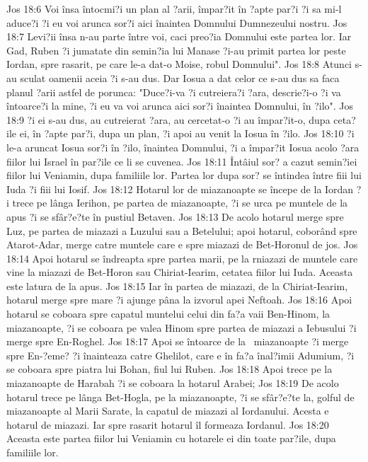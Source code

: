 Jos 18:6  Voi însa întocmi?i un plan al ?arii, împar?it în ?apte par?i ?i sa mi-l aduce?i ?i eu voi arunca sor?i aici înaintea Domnului Dumnezeului nostru.
Jos 18:7  Levi?ii însa n-au parte între voi, caci preo?ia Domnului este partea lor. Iar Gad, Ruben ?i jumatate din semin?ia lui Manase ?i-au primit partea lor peste Iordan, spre rasarit, pe care le-a dat-o Moise, robul Domnului".
Jos 18:8  Atunci s-au sculat oamenii aceia ?i s-au dus. Dar Iosua a dat celor ce s-au dus sa faca planul ?arii astfel de porunca: "Duce?i-va ?i cutreiera?i ?ara, descrie?i-o ?i va întoarce?i la mine, ?i eu va voi arunca aici sor?i înaintea Domnului, în ?ilo".
Jos 18:9  ?i ei s-au dus, au cutreierat ?ara, au cercetat-o ?i au împar?it-o, dupa ceta?ile ei, în ?apte par?i, dupa un plan, ?i apoi au venit la Iosua în ?ilo.
Jos 18:10  ?i le-a aruncat Iosua sor?i în ?ilo, înaintea Domnului, ?i a împar?it Iosua acolo ?ara fiilor lui Israel în par?ile ce li se cuvenea.
Jos 18:11  Întâiul sor? a cazut semin?iei fiilor lui Veniamin, dupa familiile lor. Partea lor dupa sor? se întindea între fiii lui Iuda ?i fiii lui Iosif.
Jos 18:12  Hotarul lor de miazanoapte se începe de la Iordan ?i trece pe lânga Ierihon, pe partea de miazanoapte, ?i se urca pe muntele de la apus ?i se sfâr?e?te în pustiul Betaven.
Jos 18:13  De acolo hotarul merge spre Luz, pe partea de miazazi a Luzului sau a Betelului; apoi hotarul, coborând spre Atarot-Adar, merge catre muntele care e spre miazazi de Bet-Horonul de jos.
Jos 18:14  Apoi hotarul se îndreapta spre partea marii, pe la rniazazi de muntele care vine la miazazi de Bet-Horon sau Chiriat-Iearim, cetatea fiilor lui Iuda. Aceasta este latura de la apus.
Jos 18:15  Iar în partea de miazazi, de la Chiriat-Iearim, hotarul merge spre mare ?i ajunge pâna la izvorul apei Neftoah.
Jos 18:16  Apoi hotarul se coboara spre capatul muntelui celui din fa?a vaii Ben-Hinom, la miazanoapte, ?i se coboara pe valea Hinom spre partea de miazazi a Iebusului ?i merge spre En-Roghel.
Jos 18:17  Apoi se întoarce de la  miazanoapte ?i merge spre En-?eme? ?i înainteaza catre Ghelilot, care e în fa?a înal?imii Adumium, ?i se coboara spre piatra lui Bohan, fiul lui Ruben.
Jos 18:18  Apoi trece pe la miazanoapte de Harabah ?i se coboara la hotarul Arabei;
Jos 18:19  De acolo hotarul trece pe lânga Bet-Hogla, pe la miazanoapte, ?i se sfâr?e?te la, golful de miazanoapte al Marii Sarate, la capatul de miazazi al Iordanului. Acesta e hotarul de miazazi. Iar spre rasarit hotarul îl formeaza Iordanul.
Jos 18:20  Aceasta este partea fiilor lui Veniamin cu hotarele ei din toate par?ile, dupa familiile lor.
